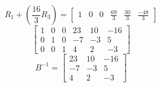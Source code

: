 \documentclass[11pt]{article}
\begin{document}
\[
    R_1 + (\frac{16}{3}R_3) = 
    \left[
    \begin{array}{ccc|ccc}
        1 & 0 & 0 & \frac{69}{3} & \frac{30}{3} & \frac{-48}{3}
    \end{array}
    \right]
\]
\[
    \left[
    \begin{array}{ccc|ccc}
        1 & 0 & 0 & 23 & 10 & -16 \\
        0 & 1 & 0 & -7 & -3 & 5 \\
        0 & 0 & 1 & 4 & 2 & -3
    \end{array}
    \right]
\]
\[
    B^{-1} = \begin{bmatrix}
        23 & 10 & -16 \\
        -7 & -3 & 5 \\
        4 & 2 & -3
    \end{bmatrix}
\]
\end{document}

